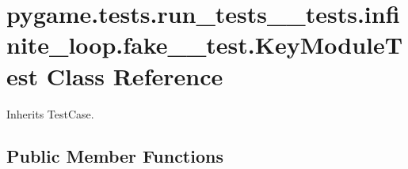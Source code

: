 \hypertarget{classpygame_1_1tests_1_1run__tests____tests_1_1infinite__loop_1_1fake__2__test_1_1_key_module_test}{}\section{pygame.\+tests.\+run\+\_\+tests\+\_\+\+\_\+tests.\+infinite\+\_\+loop.\+fake\+\_\+\_\+test.\+Key\+Module\+Test Class Reference}
\label{classpygame_1_1tests_1_1run__tests____tests_1_1infinite__loop_1_1fake__2__test_1_1_key_module_test}


Inherits Test\+Case.

\subsection*{Public Member Functions}
